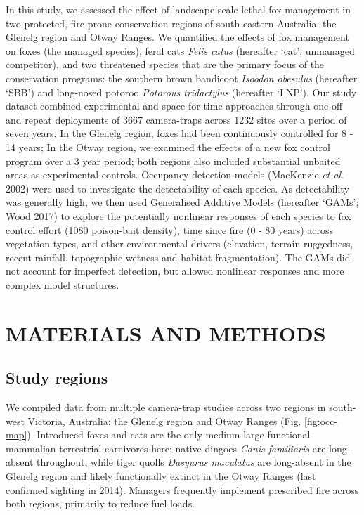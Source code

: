 \documentclass[]{elsarticle} %
\begin{document}
In this study, we assessed the effect of landscape-scale lethal fox management in two protected, fire-prone conservation regions of south-eastern Australia: the Glenelg region and Otway Ranges. We quantified the effects of fox management on foxes (the managed species), feral cats \emph{Felis catus} (hereafter `cat'; unmanaged competitor), and two threatened species that are the primary focus of the conservation programs: the southern brown bandicoot \emph{Isoodon obesulus} (hereafter `SBB') and long-nosed potoroo \emph{Potorous tridactylus} (hereafter `LNP'). Our study dataset combined experimental and space-for-time approaches through one-off and repeat deployments of 3667 camera-traps across 1232 sites over a period of seven years. In the Glenelg region, foxes had been continuously controlled for 8 - 14 years; In the Otway region, we examined the effects of a new fox control program over a 3 year period; both regions also included substantial unbaited areas as experimental controls. Occupancy-detection models (MacKenzie \emph{et al.} 2002) were used to investigate the detectability of each species. As detectability was generally high, we then used Generalised Additive Models (hereafter `GAMs'; Wood 2017) to explore the potentially nonlinear responses of each species to fox control effort (1080 poison-bait density), time since fire (0 - 80 years) across vegetation types, and other environmental drivers (elevation, terrain ruggedness, recent rainfall, topographic wetness and habitat fragmentation). The GAMs did not account for imperfect detection, but allowed nonlinear responses and more complex model structures.

\newpage

\hypertarget{materials-and-methods}{%
\section{MATERIALS AND METHODS}\label{materials-and-methods}}

\hypertarget{study-regions}{%
\subsection{Study regions}\label{study-regions}}

We compiled data from multiple camera-trap studies across two regions in south-west Victoria, Australia: the Glenelg region and Otway Ranges (Fig. \ref{fig:occ-map}). Introduced foxes and cats are the only medium-large functional mammalian terrestrial carnivores here: native dingoes \emph{Canis familiaris} are long-absent throughout, while tiger quolls \emph{Dasyurus maculatus} are long-absent in the Glenelg region and likely functionally extinct in the Otway Ranges (last confirmed sighting in 2014). Managers frequently implement prescribed fire across both regions, primarily to reduce fuel loads.
\end{document}
